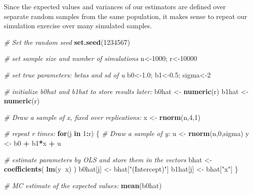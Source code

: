 \documentclass[]{book}
\newenvironment{Shaded}{\begin{snugshade}}{\end{snugshade}}
\newcommand{\CommentTok}[1]{\textcolor[rgb]{0.56,0.35,0.01}{\textit{#1}}}
\newcommand{\ControlFlowTok}[1]{\textcolor[rgb]{0.13,0.29,0.53}{\textbf{#1}}}
\newcommand{\DecValTok}[1]{\textcolor[rgb]{0.00,0.00,0.81}{#1}}
\newcommand{\FloatTok}[1]{\textcolor[rgb]{0.00,0.00,0.81}{#1}}
\newcommand{\KeywordTok}[1]{\textcolor[rgb]{0.13,0.29,0.53}{\textbf{#1}}}
\newcommand{\NormalTok}[1]{#1}
\newcommand{\OperatorTok}[1]{\textcolor[rgb]{0.81,0.36,0.00}{\textbf{#1}}}
\newcommand{\StringTok}[1]{\textcolor[rgb]{0.31,0.60,0.02}{#1}}
\begin{document}
Since the expected values and variances of our estimators are defined
over separate random samples from the same population, it makes sense to
repeat our simulation exercise over many simulated samples.

\begin{Shaded}
\begin{Highlighting}[]
\CommentTok{# Set the random seed}
\KeywordTok{set.seed}\NormalTok{(}\DecValTok{1234567}\NormalTok{)}

\CommentTok{# set sample size and number of simulations}
\NormalTok{n<-}\DecValTok{1000}\NormalTok{; r<-}\DecValTok{10000}

\CommentTok{# set true parameters: betas and sd of u}
\NormalTok{b0<-}\FloatTok{1.0}\NormalTok{; b1<-}\FloatTok{0.5}\NormalTok{; sigma<-}\DecValTok{2}

\CommentTok{# initialize b0hat and b1hat to store results later:}
\NormalTok{b0hat <-}\StringTok{ }\KeywordTok{numeric}\NormalTok{(r)}
\NormalTok{b1hat <-}\StringTok{ }\KeywordTok{numeric}\NormalTok{(r)}

\CommentTok{# Draw a sample of x, fixed over replications:}
\NormalTok{x <-}\StringTok{ }\KeywordTok{rnorm}\NormalTok{(n,}\DecValTok{4}\NormalTok{,}\DecValTok{1}\NormalTok{)}

\CommentTok{# repeat r times:}
\ControlFlowTok{for}\NormalTok{(j }\ControlFlowTok{in} \DecValTok{1}\OperatorTok{:}\NormalTok{r) \{}
  \CommentTok{# Draw a sample of y:}
\NormalTok{  u <-}\StringTok{ }\KeywordTok{rnorm}\NormalTok{(n,}\DecValTok{0}\NormalTok{,sigma)}
\NormalTok{  y <-}\StringTok{ }\NormalTok{b0 }\OperatorTok{+}\StringTok{ }\NormalTok{b1}\OperatorTok{*}\NormalTok{x }\OperatorTok{+}\StringTok{ }\NormalTok{u}
  
  \CommentTok{# estimate parameters by OLS and store them in the vectors}
\NormalTok{  bhat <-}\StringTok{ }\KeywordTok{coefficients}\NormalTok{( }\KeywordTok{lm}\NormalTok{(y}\OperatorTok{~}\NormalTok{x) )}
\NormalTok{  b0hat[j] <-}\StringTok{ }\NormalTok{bhat[}\StringTok{"(Intercept)"}\NormalTok{]}
\NormalTok{  b1hat[j] <-}\StringTok{ }\NormalTok{bhat[}\StringTok{"x"}\NormalTok{]}
\NormalTok{\}}
\end{Highlighting}
\end{Shaded}

\begin{Shaded}
\begin{Highlighting}[]
\CommentTok{# MC estimate of the expected values:}
\KeywordTok{mean}\NormalTok{(b0hat)}
\end{Highlighting}
\end{Shaded}
\end{document}
